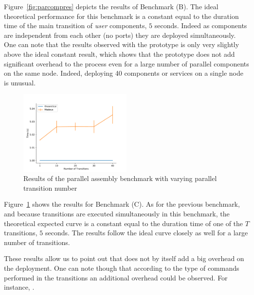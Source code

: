 Figure~\ref{fig:parcompres} depicts the results of Benchmark (B). The
ideal theoretical performance for this benchmark is a constant equal
to the duration time of the main transition of \emph{user} components,
\ie $5$ seconds. Indeed as components are independent from each other
(no ports) they are deployed simultaneously.
One can note that the results observed with the \mad prototype is only
very slightly above the ideal constant result, which shows that the
prototype does not add significant overhead to the process even for a
large number of parallel components on the same node. Indeed,
deploying 40 components or services on a single node is unusual.

\begin{figure}[h]
  \begin{center} 
    \includegraphics[width=0.5\textwidth]{./images/evaluations_par_transitions.pdf}
    \caption{Results of the parallel assembly benchmark with varying parallel transition number}
    \label{fig:partrans}
  \end{center}
\end{figure}

Figure~\ref{fig:partrans} shows the results for Benchmark (C). As for
the previous benchmark, and because transitions are executed
simultaneously in this benchmark, the theoretical expected curve is a
constant equal to the duration time of one of the $T$ transitions, \ie
$5$ seconds. The results follow the ideal curve closely as well for a
large number of transitions.


These results allow us to point out that \mad does not by itself add a
big overhead on the deployment. One can note though that according to
the type of commands performed in the transitions  an additional
overhead could be observed. For instance, .


